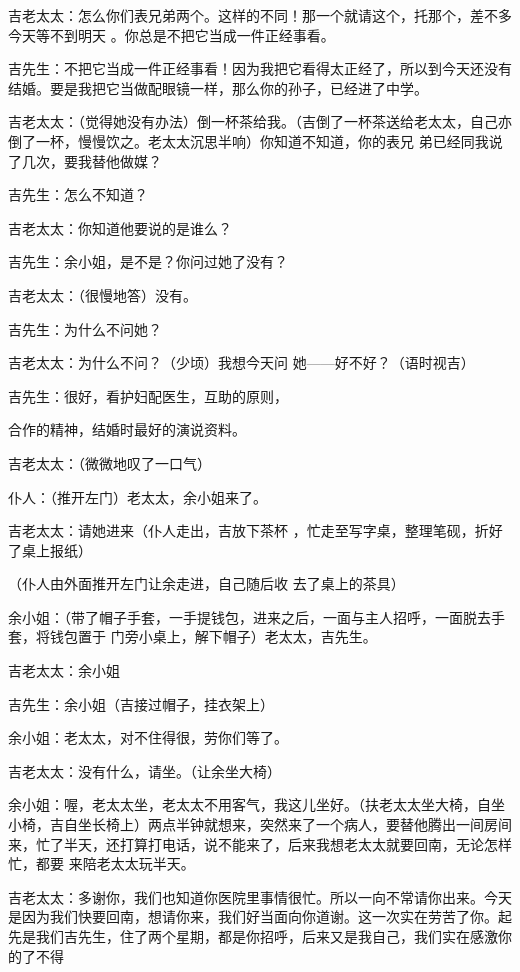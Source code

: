 \documentclass{article}
\begin{document}
吉老太太：怎么你们表兄弟两个。这样的不同！那一个就请这个，托那个，差不多今天等不到明天
。你总是不把它当成一件正经事看。 

吉先生：不把它当成一件正经事看！因为我把它看得太正经了，所以到今天还没有结婚。要是我把它当做配眼镜一样，那么你的孙子，已经进了中学。
\newpage


吉老太太：（觉得她没有办法）倒一杯茶给我。（吉倒了一杯茶送给老太太，自己亦倒了一杯，慢慢饮之。老太太沉思半响）你知道不知道，你的表兄
弟已经同我说了几次，要我替他做媒？ 


吉先生：怎么不知道？ 



吉老太太：你知道他要说的是谁么？ 

吉先生：余小姐，是不是？你问过她了没有？


吉老太太：（很慢地答）没有。 


吉先生：为什么不问她？ 

吉老太太：为什么不问？（少顷）我想今天问
她——好不好？（语时视吉） 

吉先生：很好，看护妇配医生，互助的原则，
\newpage

合作的精神，结婚时最好的演说资料。 


吉老太太：（微微地叹了一口气） 


仆人：（推开左门）老太太，余小姐来了。 

吉老太太：请她进来（仆人走出，吉放下茶杯
，忙走至写字桌，整理笔砚，折好了桌上报纸） 

（仆人由外面推开左门让余走进，自己随后收
去了桌上的茶具） 

余小姐：（带了帽子手套，一手提钱包，进来之后，一面与主人招呼，一面脱去手套，将钱包置于
门旁小桌上，解下帽子）老太太，吉先生。 


吉老太太：余小姐 


吉先生：余小姐（吉接过帽子，挂衣架上） 

余小姐：老太太，对不住得很，劳你们等了。
\newpage


吉老太太：没有什么，请坐。（让余坐大椅）

余小姐：喔，老太太坐，老太太不用客气，我这儿坐好。（扶老太太坐大椅，自坐小椅，吉自坐长椅上）两点半钟就想来，突然来了一个病人，要替他腾出一间房间来，忙了半天，还打算打电话，说不能来了，后来我想老太太就要回南，无论怎样忙，都要
来陪老太太玩半天。 

吉老太太：多谢你，我们也知道你医院里事情很忙。所以一向不常请你出来。今天是因为我们快要回南，想请你来，我们好当面向你道谢。这一次实在劳苦了你。起先是我们吉先生，住了两个星期，都是你招呼，后来又是我自己，我们实在感激你的了不得
\end{document}
